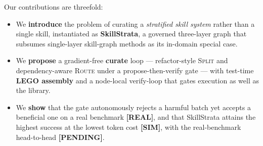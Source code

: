 Our contributions are threefold:
\begin{itemize}[leftmargin=*, itemsep=0pt]
    \item We \textbf{introduce} the problem of curating a \emph{stratified skill system} rather than a single skill, instantiated as \textbf{SkillStrata}, a governed three-layer graph that subsumes single-layer skill-graph methods as its in-domain special case.
    \item We \textbf{propose} a gradient-free \textbf{curate} loop --- refactor-style \textsc{Split} and dependency-aware \textsc{Route} under a propose-then-verify gate --- with test-time \textbf{LEGO assembly} and a node-local verify-loop that gates execution as well as the library.
    \item We \textbf{show} that the gate autonomously rejects a harmful batch yet accepts a beneficial one on a real benchmark \textbf{[REAL]}, and that SkillStrata attains the highest success at the lowest token cost \textbf{[SIM]}, with the real-benchmark head-to-head \textbf{[PENDING]}.
\end{itemize}

